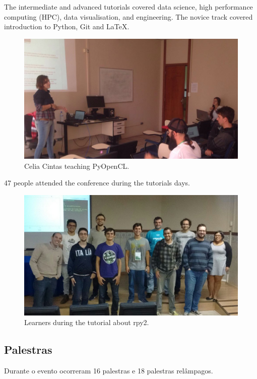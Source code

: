 \documentclass[12pt]{article}
\begin{document}
The intermediate and advanced tutorials covered
data science,
high performance computing (HPC),
data visualisation, and
engineering.
The novice track covered introduction to Python, Git and LaTeX.

\begin{figure}[!htb]
\center
\includegraphics[height=.3\textheight]{tutorial-pyopencl.jpg}
\caption{Celia Cintas teaching PyOpenCL.}
\end{figure}

47 people attended the conference during the tutorials days.

\begin{figure}[!htb]
\center
\includegraphics[height=.3\textheight]{tutorial-rpy.jpg}
\caption{Learners during the tutorial about rpy2.}
\end{figure}

\subsection*{Palestras}

Durante o evento ocorreram 16 palestras e 18 palestras relâmpagos.
\end{document}
